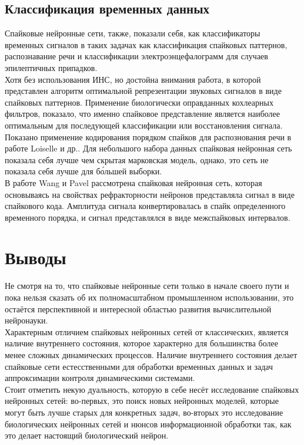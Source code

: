 \documentclass[a4paper,10pt]{article}
\begin{document}
\subsection{Классификация временных данных}
\indent Спайковые нейронные сети, также, показали себя, как классификаторы временных сигналов в таких задачах как классификация спайковых паттернов\cite{ponulak2010supervised,maass2002paradigms}, распознавание речи\cite{brody2003simple,gutig2009time} и классификации электроэнцефалограмм для случаев эпилептичных припадков\cite{ghosh2009new}.\\
\indent Хотя без использования ИНС, но достойна внимания работа\cite{smith2006efficient}, в которой представлен алгоритм оптимальной репрезентации звуковых сигналов в виде спайковых паттернов. Применение биологически оправданных кохлеарных фильтров, показало, что именно спайковое представление является наиболее оптимальным для последующей классификации или восстановления сигнала.\\
\indent Показано применение кодирования порядком спайков для распознования речи в работе Loiselle и др.\cite{loiselle2005exploration}. Для небольшого набора данных спайковая нейронная сеть показала себя лучше чем скрытая марковская модель, однако, это сеть не показала себя лучше для б\'{о}льшей выборки.\\
\indent В работе Wang и Pavel\cite{wang2005spiking} рассмотрена спайковая нейронная сеть, которая основываясь на свойствах рефракторности нейронов представляла сигнал в виде спайкового кода. Амплитуда сигнала конвертировалась в спайк определенного временного порядка, и сигнал представлялся в виде межспайковых интервалов.\\
\section{Выводы}
\indent Не смотря на то, что спайковые нейронные сети только в начале своего пути и пока нельзя сказать об их  полномасштабном промышленном использовании, это остаётся перспективной и интересной областью развития вычислительной нейронауки.\\
\indent Характерным отличием спайковых нейронных сетей от классических, является наличие внутреннего состояния, которое характерно для большинства более менее сложных динамических процессов. Наличие внутреннего состояния делает спайковые сети естесственными для обработки временных данных и задач аппроксимации контроля динамическими системами.\\
\indent Стоит отметить некую дуальность, которую в себе несёт исследование спайковых нейронных сетей: во-первых, это поиск новых нейронных моделей, которые могут быть лучше старых для конкретных задач, во-вторых это исследование биологических нейронных сетей и нюнсов информационной обработки так, как это делает настоящий биологический нейрон.\\

{}

\end{document}

